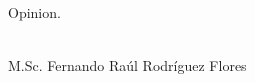 
\begin{opinion}

Opinion.

\vfill
\begin{flushright}
\underline{\hspace{186pt}}\hfill \\
M.Sc. Fernando Ra\'ul Rodr\'iguez Flores
\end{flushright}
\end{opinion}
